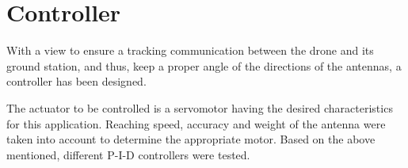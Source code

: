 \chapter{Controller}\label{sec:controller}
With a view to ensure a tracking communication between the drone and its ground station, and thus, keep a proper angle of the directions of the antennas, a controller has been designed.\par

The actuator to be controlled is a servomotor having the desired characteristics for this application.  Reaching speed, accuracy and weight of the antenna were taken into account to determine the appropriate motor. Based on the above mentioned, different P-I-D controllers were tested.\par 	









